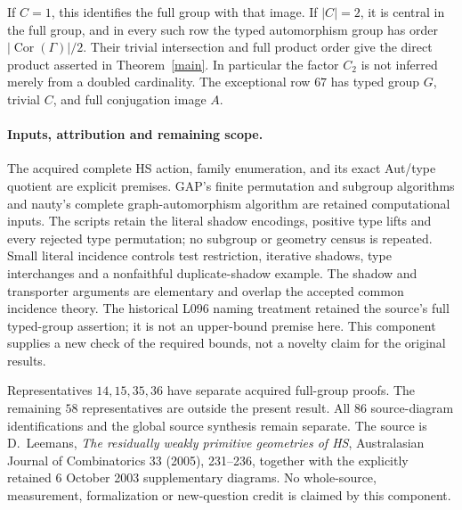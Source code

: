 \documentclass[11pt]{article}
\newcommand{\Cor}{\operatorname{Cor}}
\begin{document}
If $C=1$, this identifies the full group with that image. If $|C|=2$,
it is central in the full group, and in every such row the typed
automorphism group has order $|\Cor(\Gamma)|/2$. Their trivial
intersection and full product order give the direct product asserted
in Theorem~\ref{main}. In particular the factor $C_2$ is not inferred
merely from a doubled cardinality. The exceptional row $67$ has
typed group $G$, trivial $C$, and full conjugation image $A$.

\paragraph{Inputs, attribution and remaining scope.}
The acquired complete HS action, family enumeration, and its exact
Aut/type quotient are explicit premises. GAP's finite permutation
and subgroup algorithms and nauty's complete graph-automorphism
algorithm are retained computational inputs. The scripts retain the
literal shadow encodings, positive type lifts and every rejected type
permutation; no subgroup or geometry census is repeated.
Small literal incidence controls test restriction, iterative shadows,
type interchanges and a nonfaithful duplicate-shadow example.
The shadow and transporter arguments are elementary and overlap the
accepted common incidence theory. The historical L096 naming treatment
retained the source's full typed-group assertion; it is not an upper-bound
premise here. This component supplies a new check of the required bounds,
not a novelty claim for the original results.

Representatives $14,15,35,36$ have separate acquired full-group proofs.
The remaining $58$ representatives are outside the present result.
All $86$ source-diagram identifications and the global source synthesis
remain separate. The source is D.~Leemans, \emph{The residually weakly
primitive geometries of HS}, Australasian Journal of Combinatorics
33 (2005), 231--236, together with the explicitly retained 6 October
2003 supplementary diagrams. No whole-source, measurement, formalization
or new-question credit is claimed by this component.
\end{document}
